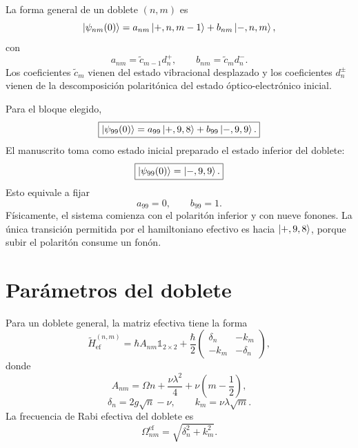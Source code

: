 \documentclass[11pt]{article}
\newcommand{\Id}{\mathds{1}}
\begin{document}
La forma general de un doblete $(n,m)$ es
\begin{equation}
  \ket{\psi_{nm}(0)}
  =
  a_{nm}\ket{+,n,m-1}
  +
  b_{nm}\ket{-,n,m},
\end{equation}
con
\begin{equation}
  \boxed{
  a_{nm}=\tilde c_{m-1}d_n^+,
  \qquad
  b_{nm}=\tilde c_md_n^-.
  }
\end{equation}
Los coeficientes $\tilde c_m$ vienen del estado vibracional desplazado y los
coeficientes $d_n^\pm$ vienen de la descomposici\'on polarit\'onica del estado
\'optico-electr\'onico inicial.

Para el bloque elegido,
\begin{equation}
  \boxed{
  \ket{\psi_{99}(0)}
  =
  a_{99}\ket{+,9,8}
  +
  b_{99}\ket{-,9,9}.
  }
\end{equation}
El manuscrito toma como estado inicial preparado el estado inferior del
doblete:
\begin{equation}
  \boxed{
  \ket{\psi_{99}(0)}=\ket{-,9,9}.
  }
\end{equation}
Esto equivale a fijar
\begin{equation}
  \boxed{
  a_{99}=0,
  \qquad
  b_{99}=1.
  }
\end{equation}
F\'isicamente, el sistema comienza con el polarit\'on inferior y con nueve
fonones. La \'unica transici\'on permitida por el hamiltoniano efectivo es
hacia $\ket{+,9,8}$, porque subir el polarit\'on consume un fon\'on.

\section{Par\'ametros del doblete}

Para un doblete general, la matriz efectiva tiene la forma
\begin{equation}
  \tilde H_{\mathrm{ef}}^{(n,m)}
  =
  \hbar A_{nm}\Id_{2\times2}
  +
  \frac{\hbar}{2}
  \begin{pmatrix}
  \delta_n & -k_m\\
  -k_m & -\delta_n
  \end{pmatrix},
\end{equation}
donde
\begin{equation}
  A_{nm}
  =
  \Omega n+\frac{\nu\lambda^2}{4}
  +
  \nu\left(m-\frac12\right),
\end{equation}
\begin{equation}
  \delta_n=2g\sqrt n-\nu,
  \qquad
  k_m=\nu\lambda\sqrt m.
\end{equation}
La frecuencia de Rabi efectiva del doblete es
\begin{equation}
  \Omega_{nm}^{\mathrm{ef}}
  =
  \sqrt{\delta_n^2+k_m^2}.
\end{equation}
\end{document}
